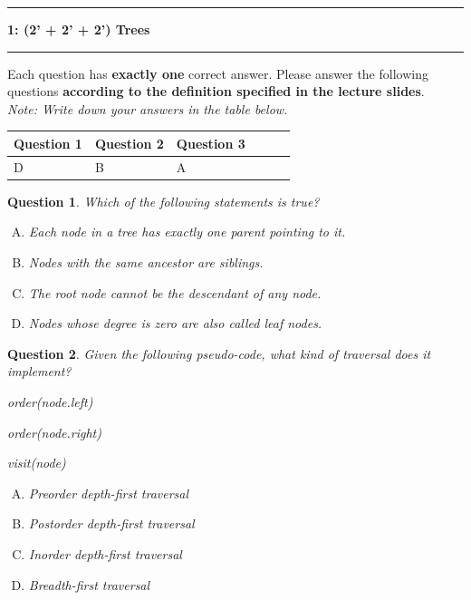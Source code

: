 \documentclass[10.5pt]{article}
\newcommand\question[2]{\vspace{.25in}\hrule\textbf{#1: #2}\vspace{.5em}\hrule\vspace{.10in}}
\newtheorem{Q}{Question}
\begin{document}
\question{1}{(2' + 2' + 2') Trees}
	Each question has \textbf{exactly one} correct answer. Please answer the following questions \textbf{according to  the definition specified in the lecture slides}.\\

	\textit{Note: Write down your answers in the table below. }
	\begin{table}[htbp]
		\begin{tabular}{|p{2cm}|p{2cm}|p{2cm}|p{2cm}|p{2cm}|p{2cm}|}
			\hline 
			Question 1 & Question 2 & Question 3 \\
			\hline 
			D& B&A  \\ 
			\hline 
		\end{tabular} 
	\end{table}

    \begin{Q}
		Which of the following statements is true?
		\begin{enumerate}[(A)]
			\item Each node in a tree has exactly one parent pointing to it.
			\item Nodes with the same ancestor are siblings.
			\item The root node cannot be the descendant of any node.
			\item Nodes whose degree is zero are also called leaf nodes.
		\end{enumerate}
	\end{Q}
	\vspace{0.5cm}
	

	\begin{Q} Given the following pseudo-code, what kind of traversal does it implement?
		
		\begin{algorithm}[H]
			\begin{algorithmic}[1]
			  \State order(node.left)
			\EndIf

			  \State order(node.right)
			\EndIf 

			\State visit(node)
			\EndFunction
			\end{algorithmic}
		\end{algorithm}


		\begin{enumerate}[(A)]
			\item Preorder depth-first traversal
			\item Postorder depth-first traversal
			\item Inorder depth-first traversal
			\item Breadth-first traversal
		\end{enumerate}
	\end{Q}
\end{document}

